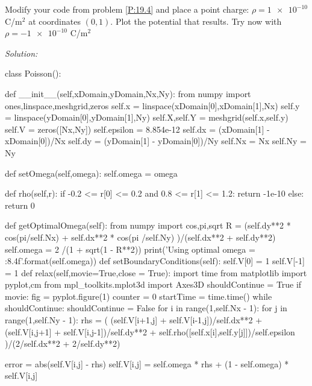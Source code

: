 \begin{enumerate}
  \prob \label{P:19.5}Modify your code from problem \ref{P:19.4} and place a point
  charge: $\rho =\num{1e-10}$ C/m$^2$ at coordinates $(0,1)$.  Plot
  the potential that results.  Try now with $\rho =\num{-1e-10}$ C/m$^2$
\end{enumerate}
\ifsolutions
\textit{Solution:}\\
\begin{codeexample}
\begin{VerbatimOut}{\listingFile}

class Poisson():

    def __init__(self,xDomain,yDomain,Nx,Ny):
        from numpy import ones,linspace,meshgrid,zeros
        self.x = linspace(xDomain[0],xDomain[1],Nx)
        self.y = linspace(yDomain[0],yDomain[1],Ny)
        self.X,self.Y = meshgrid(self.x,self.y)
        self.V = zeros([Nx,Ny])
        self.epsilon = 8.854e-12
        self.dx = (xDomain[1] - xDomain[0])/Nx
        self.dy = (yDomain[1] - yDomain[0])/Ny
        self.Nx = Nx
        self.Ny = Ny

    def setOmega(self,omega):
        self.omega = omega

    def rho(self,r):
        if -0.2 <= r[0] <= 0.2 and 0.8 <= r[1] <= 1.2:
            return -1e-10
        else:
            return 0
        
    def getOptimalOmega(self):
        from numpy import cos,pi,sqrt
        R = (self.dy**2 * cos(pi/self.Nx) + self.dx**2 * cos(pi /self.Ny) )/(self.dx**2 + self.dy**2)
        self.omega = 2 /(1 + sqrt(1 - R**2))
        print('Using optimal omega = {:8.4f}'.format(self.omega))
    def setBoundaryConditions(self):
        self.V[0] = 1
        self.V[-1] = 1
    def relax(self,movie=True,close = True):
        import time
        from matplotlib import pyplot,cm
        from mpl_toolkits.mplot3d import Axes3D
        shouldContinue = True
        if movie:
            fig = pyplot.figure(1)
        counter = 0
        startTime = time.time()
        while shouldContinue:
            shouldContinue = False
            for i in range(1,self.Nx - 1):
                for j in range(1,self.Ny - 1):
                    rhs =  ( (self.V[i+1,j] + self.V[i-1,j])/self.dx**2 + (self.V[i,j+1] + self.V[i,j-1])/self.dy**2   + self.rho([self.x[i],self.y[j]])/self.epsilon )/(2/self.dx**2 + 2/self.dy**2)

                    error = abs(self.V[i,j] - rhs)
                    self.V[i,j] = self.omega * rhs + (1 - self.omega) * self.V[i,j]


\end{VerbatimOut}
\end{codeexample}
